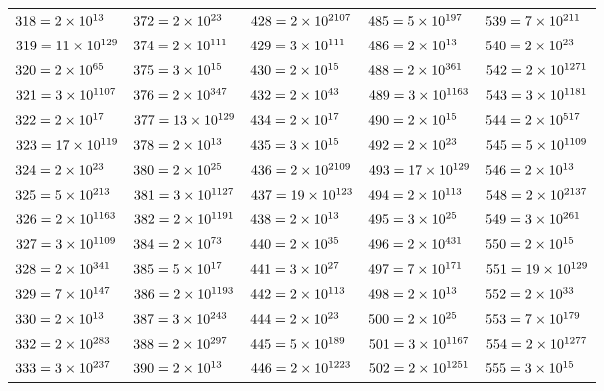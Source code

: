 \documentclass[10pt,a4paper]{book}
\begin{document}
\begin{tabular}{lllll}
	$318=\num{2e{1}3e{1}53e{1}}$&$372=\num{2e{2}3e{1}31e{1}}$&$428=\num{2e{2}107e{1}}$&$485=\num{5e{1}97e{1}}$&$539=\num{7e{2}11e{1}}$\\
	$319=\num{11e{1}29e{1}}$&$374=\num{2e{1}11e{1}17e{1}}$&$429=\num{3e{1}11e{1}13e{1}}$&$486=\num{2e{1}3e{5}}$&$540=\num{2e{2}3e{3}5e{1}}$\\
	$320=\num{2e{6}5e{1}}$&$375=\num{3e{1}5e{3}}$&$430=\num{2e{1}5e{1}43e{1}}$&$488=\num{2e{3}61e{1}}$&$542=\num{2e{1}271e{1}}$\\
	$321=\num{3e{1}107e{1}}$&$376=\num{2e{3}47e{1}}$&$432=\num{2e{4}3e{3}}$&$489=\num{3e{1}163e{1}}$&$543=\num{3e{1}181e{1}}$\\
	$322=\num{2e{1}7e{1}23e{1}}$&$377=\num{13e{1}29e{1}}$&$434=\num{2e{1}7e{1}31e{1}}$&$490=\num{2e{1}5e{1}7e{2}}$&$544=\num{2e{5}17e{1}}$\\
	$323=\num{17e{1}19e{1}}$&$378=\num{2e{1}3e{3}7e{1}}$&$435=\num{3e{1}5e{1}29e{1}}$&$492=\num{2e{2}3e{1}41e{1}}$&$545=\num{5e{1}109e{1}}$\\
	$324=\num{2e{2}3e{4}}$&$380=\num{2e{2}5e{1}19e{1}}$&$436=\num{2e{2}109e{1}}$&$493=\num{17e{1}29e{1}}$&$546=\num{2e{1}3e{1}7e{1}13e{1}}$\\
	$325=\num{5e{2}13e{1}}$&$381=\num{3e{1}127e{1}}$&$437=\num{19e{1}23e{1}}$&$494=\num{2e{1}13e{1}19e{1}}$&$548=\num{2e{2}137e{1}}$\\
	$326=\num{2e{1}163e{1}}$&$382=\num{2e{1}191e{1}}$&$438=\num{2e{1}3e{1}73e{1}}$&$495=\num{3e{2}5e{1}11e{1}}$&$549=\num{3e{2}61e{1}}$\\
	$327=\num{3e{1}109e{1}}$&$384=\num{2e{7}3e{1}}$&$440=\num{2e{3}5e{1}11e{1}}$&$496=\num{2e{4}31e{1}}$&$550=\num{2e{1}5e{2}11e{1}}$\\
	$328=\num{2e{3}41e{1}}$&$385=\num{5e{1}7e{1}11e{1}}$&$441=\num{3e{2}7e{2}}$&$497=\num{7e{1}71e{1}}$&$551=\num{19e{1}29e{1}}$\\
	$329=\num{7e{1}47e{1}}$&$386=\num{2e{1}193e{1}}$&$442=\num{2e{1}13e{1}17e{1}}$&$498=\num{2e{1}3e{1}83e{1}}$&$552=\num{2e{3}3e{1}23e{1}}$\\
	$330=\num{2e{1}3e{1}5e{1}11e{1}}$&$387=\num{3e{2}43e{1}}$&$444=\num{2e{2}3e{1}37e{1}}$&$500=\num{2e{2}5e{3}}$&$553=\num{7e{1}79e{1}}$\\
	$332=\num{2e{2}83e{1}}$&$388=\num{2e{2}97e{1}}$&$445=\num{5e{1}89e{1}}$&$501=\num{3e{1}167e{1}}$&$554=\num{2e{1}277e{1}}$\\
	$333=\num{3e{2}37e{1}}$&$390=\num{2e{1}3e{1}5e{1}13e{1}}$&$446=\num{2e{1}223e{1}}$&$502=\num{2e{1}251e{1}}$&$555=\num{3e{1}5e{1}37e{1}}$\\

\end{tabular}
\end{document}
